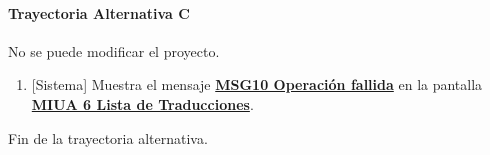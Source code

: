\paragraph{Trayectoria Alternativa C} \label{A-PR-CU1.1.2:TC}
	No se puede modificar el proyecto.
	\begin{enumerate}[label=C\arabic*.]
		\item {[Sistema]} Muestra el mensaje \hyperref[MSG10]{\bf MSG10 Operación fallida} en la pantalla \hyperref[fig:MIUA-6]{\bf MIUA 6 Lista de Traducciones}.
	\end{enumerate}
	Fin de la trayectoria alternativa.